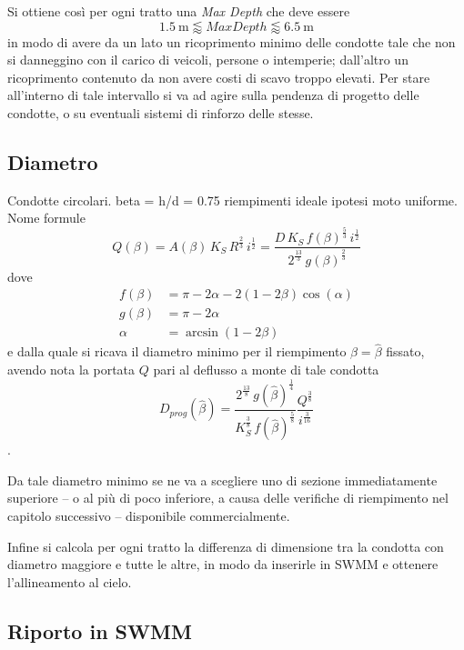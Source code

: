Si ottiene così per ogni tratto una \emph{Max Depth} che deve essere
\begin{equation}
    \SI{1.5}{\metre} \lessapprox Max Depth \lessapprox\SI{6.5}{\metre}
\end{equation}
in modo di avere da un lato un ricoprimento minimo delle condotte tale che non si danneggino con il carico di veicoli, persone o intemperie;  dall'altro un ricoprimento contenuto da non avere costi di scavo troppo elevati. 
Per stare all'interno di tale intervallo si va ad agire sulla pendenza di progetto delle condotte, o su eventuali sistemi di rinforzo delle stesse.
\subsection{Diametro}
Condotte circolari.
beta = h/d = 0.75 riempimenti ideale
ipotesi moto uniforme. 
Nome formule
\begin{equation}
    Q(\beta) 
    = A(\beta) \, K_S \, R^{\tfrac{2}{3}} \, i^{\tfrac{1}{2}} 
    = \frac{ D \, K_S \, f(\beta)^{\tfrac{5}{3}} \, i^{\tfrac{1}{2}} }{ 2^{\tfrac{13}{3}} \, g(\beta)^{\tfrac{2}{3}} }
\end{equation}
dove 
\begin{align}
    f(\beta) &= \pi - 2 \alpha - 2 (1 - 2 \beta) \cos(\alpha) \\
    g(\beta) &= \pi - 2 \alpha \\
    \alpha &= \arcsin(1 - 2 \beta)
\end{align}
e dalla quale si ricava il diametro minimo per il riempimento $\beta = \hat{\beta}$ fissato, avendo nota la portata $Q$ pari al deflusso a monte di tale condotta
\begin{equation}
    D_{prog}(\hat{\beta}) = \frac{ 2^{\tfrac{13}{8}} \, g(\hat{\beta})^{\tfrac{1}{4}} }{     K_S^{\tfrac{3}{8}} \, f(\hat{\beta})^{\tfrac{5}{8}} } \frac{Q^{\tfrac{3}{8}}}{i^{\tfrac{3}{16}}}
\end{equation} \quad .

Da tale diametro minimo se ne va a scegliere uno di sezione immediatamente superiore -- o al più di poco inferiore, a causa delle verifiche di riempimento nel capitolo successivo -- disponibile commercialmente.

Infine si calcola per ogni tratto la differenza di dimensione tra la condotta con diametro maggiore e tutte le altre, in modo da inserirle in SWMM e ottenere l'allineamento al cielo.

\subsection{Riporto in SWMM}
